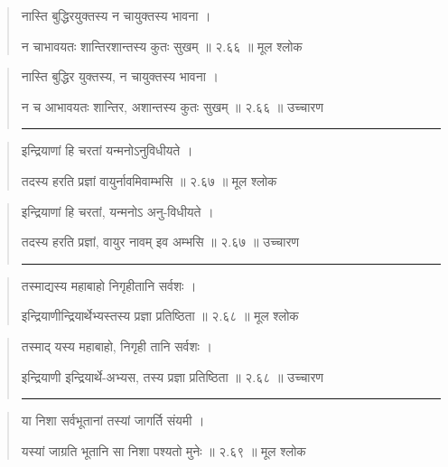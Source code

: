 \begin{quotation}

नास्ति बुद्धिरयुक्तस्य न चायुक्तस्य भावना  ।  

न चाभावयतः शान्तिरशान्तस्य कुतः सुखम्‌  ॥ २.६६ ॥  मूल श्लोक
\end{quotation}

\begin{quotation}

नास्ति बुद्धिर युक्तस्य, न चायुक्तस्य भावना  ।  

न च आभावयतः शान्तिर, अशान्तस्य कुतः सुखम्‌  ॥ २.६६ ॥  उच्चारण

\noindent\rule{16cm}{0.4pt} 
\end{quotation}


\begin{quotation}

इन्द्रियाणां हि चरतां यन्मनोऽनुविधीयते  ।  

तदस्य हरति प्रज्ञां वायुर्नावमिवाम्भसि  ॥ २.६७ ॥  मूल श्लोक
\end{quotation}

\begin{quotation}

इन्द्रियाणां हि चरतां, यन्मनोऽ अनु-विधीयते  ।  

तदस्य हरति प्रज्ञां, वायुर नावम्  इव अम्भसि  ॥ २.६७ ॥  उच्चारण

\noindent\rule{16cm}{0.4pt} 
\end{quotation}


\begin{quotation}

तस्माद्यस्य महाबाहो निगृहीतानि सर्वशः  ।  

इन्द्रियाणीन्द्रियार्थेभ्यस्तस्य प्रज्ञा प्रतिष्ठिता  ॥ २.६८ ॥  मूल श्लोक
\end{quotation}

\begin{quotation}

तस्माद् यस्य महाबाहो, निगृही तानि सर्वशः  ।  

इन्द्रियाणी इन्द्रियार्थे-अभ्यस, तस्य प्रज्ञा प्रतिष्ठिता  ॥ २.६८ ॥  उच्चारण

\noindent\rule{16cm}{0.4pt} 
\end{quotation}


\begin{quotation}

या निशा सर्वभूतानां तस्यां जागर्ति संयमी  ।  

यस्यां जाग्रति भूतानि सा निशा पश्यतो मुनेः  ॥ २.६९ ॥  मूल श्लोक
\end{quotation}

